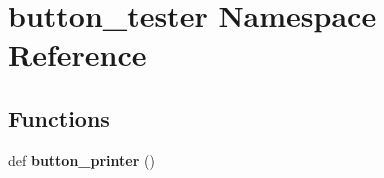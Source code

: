 \hypertarget{namespacebutton__tester}{}\section{button\+\_\+tester Namespace Reference}
\label{namespacebutton__tester}
\subsection*{Functions}
\begin{DoxyCompactItemize}
\item 
\mbox{\label{namespacebutton__tester_a57ea8564ada9b5ffcc8b1824c960138a}} 
def {\bfseries button\+\_\+printer} ()
\end{DoxyCompactItemize}
